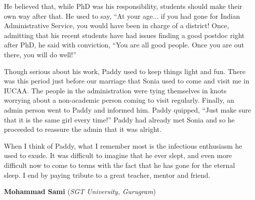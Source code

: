 \documentclass[prd, preprint, longbibliography, 11pt]{revtex4-1}
\begin{document}
He believed that, while PhD was his responsibility, students should make their own way after that. He used to say, ``At your age... if you had gone for Indian Administrative Service, you would have been in charge of a district! Once, admitting that his recent students have had issues finding a good postdoc right after PhD, he said with conviction, ``You are all good people. Once you are out there, you will do well!''

Though serious about his work, Paddy used to keep things light and fun. There was this period just before our marriage that Sonia used to come and visit me in IUCAA. The people in the administration were tying themselves in knots worrying about a non-academic person coming to visit regularly. Finally, an admin person went to Paddy and informed him. Paddy quipped, ``Just make sure that it is the same girl every time!'' Paddy had already met Sonia and so he proceeded to reassure the admin that it was alright.

When I think of Paddy, what I remember most is the infectious enthusiasm he used to exude. It was difficult to imagine that he ever slept, and even more difficult now to come to terms with the fact that he has gone for the eternal sleep. I end by paying tribute to a great teacher, mentor and friend.

 \bigskip
 
 \bigskip



\centerline{{\bf Mohammad Sami} ({\it SGT University, Gurugram})}
\medskip
{}
\end{document}
